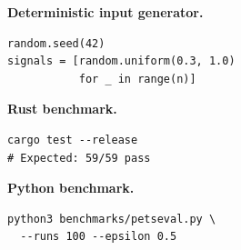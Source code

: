 \textbf{Deterministic input generator.}
\begin{verbatim}
random.seed(42)
signals = [random.uniform(0.3, 1.0)
           for _ in range(n)]
\end{verbatim}

\textbf{Rust benchmark.}
\begin{verbatim}
cargo test --release
# Expected: 59/59 pass
\end{verbatim}

\textbf{Python benchmark.}
\begin{verbatim}
python3 benchmarks/petseval.py \
  --runs 100 --epsilon 0.5
\end{verbatim}
